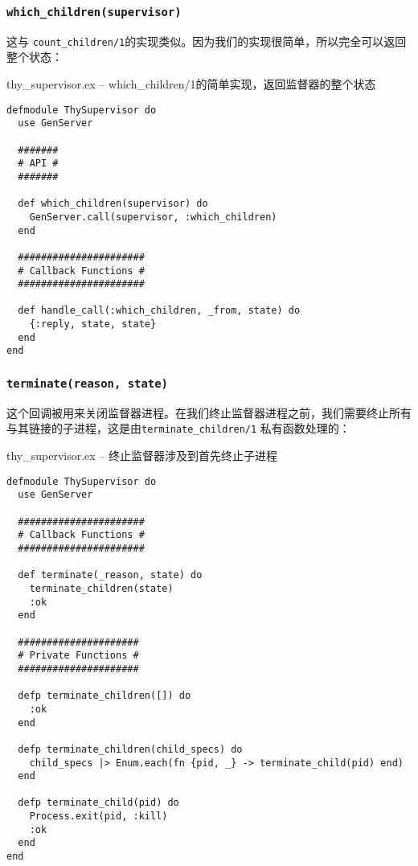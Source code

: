 \subsubsection{\texttt{which\_children(supervisor)}}

这与 \texttt{count\_children/1}的实现类似。因为我们的实现很简单，所以完全可以返回整个状态：

\begin{code}{thy\_supervisor.ex -- which\_children/1的简单实现，返回监督器的整个状态}
\begin{verbatim}
defmodule ThySupervisor do
  use GenServer

  #######
  # API #
  #######

  def which_children(supervisor) do
    GenServer.call(supervisor, :which_children)
  end

  ######################
  # Callback Functions #
  ######################

  def handle_call(:which_children, _from, state) do
    {:reply, state, state}
  end
end
\end{verbatim}
\label{lst:which_children_simple}
\end{code}

\subsubsection{\texttt{terminate(reason, state)}}

这个回调被用来关闭监督器进程。在我们终止监督器进程之前，我们需要终止所有与其链接的子进程，这是由\texttt{terminate\_children/1} 私有函数处理的：

\begin{code}{thy\_supervisor.ex -- 终止监督器涉及到首先终止子进程}
\begin{verbatim}
defmodule ThySupervisor do
  use GenServer

  ######################
  # Callback Functions #
  ######################

  def terminate(_reason, state) do
    terminate_children(state)
    :ok
  end

  #####################
  # Private Functions #
  #####################

  defp terminate_children([]) do
    :ok
  end

  defp terminate_children(child_specs) do
    child_specs |> Enum.each(fn {pid, _} -> terminate_child(pid) end)
  end

  defp terminate_child(pid) do
    Process.exit(pid, :kill)
    :ok
  end
end
\end{verbatim}
\label{lst:terminate_supervisor}
\end{code}

